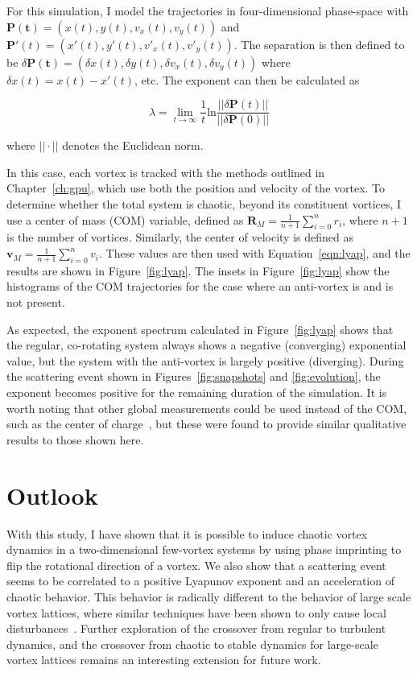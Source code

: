For this simulation, I model the trajectories in four-dimensional phase-space with $\mathbf{P(t)} = (x(t), y(t), v_x(t), v_y(t))$ and $\mathbf{P}'(t) = (x'(t), y'(t), v'_x(t), v'_y(t))$.
The separation is then defined to be $\delta \mathbf{P(t)} = (\delta x(t), \delta y(t), \delta v_x(t), \delta v_y(t))$ where $\delta x(t) = x(t) - x'(t)$, etc.
The exponent can then be calculated as

\begin{equation}
\lambda = \lim_{t\to\infty}\frac{1}{t}\text{ln}\frac{||\delta\textbf{P}(t)||}{||\delta\textbf{P}(0)||}
\label{eqn:lyap}
\end{equation}

\noindent where $||\cdot||$ denotes the Euclidean norm.

In this case, each vortex is tracked with the methods outlined in Chapter~\ref{ch:gpu}, which use both the position and velocity of the vortex.
To determine whether the total system is chaotic, beyond its constituent vortices, I use a center of mass (COM) variable, defined as $\mathbf{R}_M = \frac{1}{n+1}\sum_{i=0}^nr_i$, where $n+1$ is the number of vortices.
Similarly, the center of velocity is defined as $\mathbf{v}_M = \frac{1}{n+1}\sum_{i=0}^nv_i$.
These values are then used with Equation~\eqref{eqn:lyap}, and the results are shown in Figure~\ref{fig:lyap}.
The insets in Figure~\ref{fig:lyap} show the histograms of the COM trajectories for the case where an anti-vortex is and is not present.

As expected, the exponent spectrum calculated in Figure~\ref{fig:lyap} shows that the regular, co-rotating system always shows a negative (converging) exponential value, but the system with the anti-vortex is largely positive (diverging).
During the scattering event shown in Figures~\ref{fig:snapshots} and \ref{fig:evolution}, the exponent becomes positive for the remaining duration of the simulation.
It is worth noting that other global measurements could be used instead of the COM, such as the center of charge~\cite{kyriakopoulos2014}, but these were found to provide similar qualitative results to those shown here.


\section{Outlook}

With this study, I have shown that it is possible to induce chaotic vortex dynamics in a two-dimensional few-vortex systems by using phase imprinting to flip the rotational direction of a vortex.
We also show that a scattering event seems to be correlated to a positive Lyapunov exponent and an acceleration of chaotic behavior.
This behavior is radically different to the behavior of large scale vortex lattices, where similar techniques have been shown to only cause local disturbances~\cite{o2016topo}.
Further exploration of the crossover from regular to turbulent dynamics, and the crossover from chaotic to stable dynamics for large-scale vortex lattices remains an interesting extension for future work.

